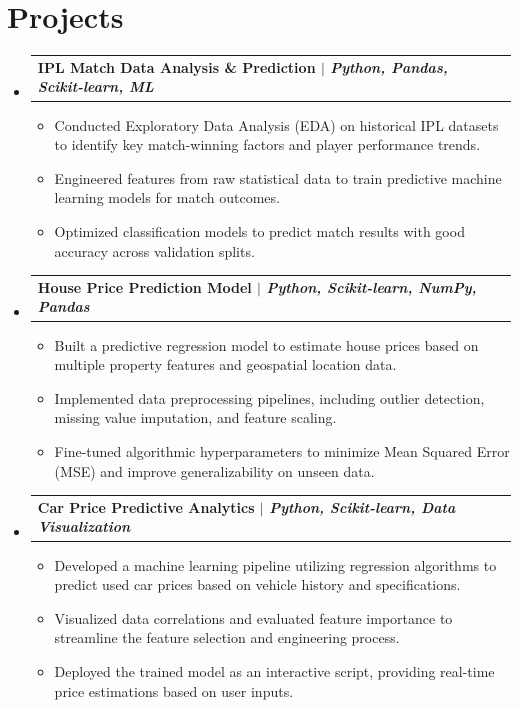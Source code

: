 \documentclass[11pt,a4paper]{article}
\makeatletter
\newcommand{\resumeProjectHeading}[2]{
    \begin{tabular*}{1\textwidth}[t]{l@{\extracolsep{\fill}}r}
      \textbf{#1} & \textit{#2} \\
    \end{tabular*}\vspace{-4pt}
}
\makeatother
\begin{document}
\section{Projects}
\begin{itemize}[leftmargin=0in, label={}, itemsep=4pt]

  \item \resumeProjectHeading
    {IPL Match Data Analysis \& Prediction $|$ \normalfont\textit{Python, Pandas, Scikit-learn, ML}}{}
    \begin{itemize}[leftmargin=0.15in, label={\textbullet}, topsep=2pt, itemsep=0pt]
      \item \small{Conducted Exploratory Data Analysis (EDA) on historical IPL datasets to identify key match-winning factors and player performance trends.}
      \item \small{Engineered features from raw statistical data to train predictive machine learning models for match outcomes.}
      \item \small{Optimized classification models to predict match results with good accuracy across validation splits.}
    \end{itemize}

  \item \resumeProjectHeading
    {House Price Prediction Model $|$ \normalfont\textit{Python, Scikit-learn, NumPy, Pandas}}{}
    \begin{itemize}[leftmargin=0.15in, label={\textbullet}, topsep=2pt, itemsep=0pt]
      \item \small{Built a predictive regression model to estimate house prices based on multiple property features and geospatial location data.}
      \item \small{Implemented data preprocessing pipelines, including outlier detection, missing value imputation, and feature scaling.}
      \item \small{Fine-tuned algorithmic hyperparameters to minimize Mean Squared Error (MSE) and improve generalizability on unseen data.}
    \end{itemize}

  \item \resumeProjectHeading
    {Car Price Predictive Analytics $|$ \normalfont\textit{Python, Scikit-learn, Data Visualization}}{}
    \begin{itemize}[leftmargin=0.15in, label={\textbullet}, topsep=2pt, itemsep=0pt]
      \item \small{Developed a machine learning pipeline utilizing regression algorithms to predict used car prices based on vehicle history and specifications.}
      \item \small{Visualized data correlations and evaluated feature importance to streamline the feature selection and engineering process.}
      \item \small{Deployed the trained model as an interactive script, providing real-time price estimations based on user inputs.}
    \end{itemize}


\end{itemize}
\end{document}
